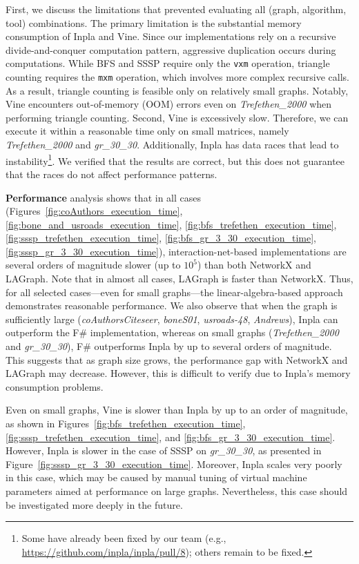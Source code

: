 First, we discuss the limitations that prevented evaluating all (graph, algorithm, tool) combinations. 
The primary limitation is the substantial memory consumption of Inpla and Vine.
Since our implementations rely on a recursive divide-and-conquer computation pattern, aggressive duplication occurs during computations. 
While BFS and SSSP require only the \verb|vxm| operation, triangle counting requires the \verb|mxm| operation, which involves more complex recursive calls.
As a result, triangle counting is feasible only on relatively small graphs.
Notably, Vine encounters out-of-memory (OOM) errors even on \emph{Trefethen\_2000} when performing triangle counting.
Second, Vine is excessively slow.
Therefore, we can execute it within a reasonable time only on small matrices, namely \emph{Trefethen\_2000} and \emph{gr\_30\_30}.
Additionally, Inpla has data races that lead to instability\footnote{Some have already been fixed by our team (e.g., \url{https://github.com/inpla/inpla/pull/8}); others remain to be fixed.}.
We verified that the results are correct, but this does not guarantee that the races do not affect performance patterns.

\textbf{Performance} analysis shows that in all cases (Figures~\ref{fig:coAuthors_execution_time}, \ref{fig:bone_and_usroads_execution_time}, \ref{fig:bfs_trefethen_execution_time}, \ref{fig:sssp_trefethen_execution_time}, \ref{fig:bfs_gr_3_30_execution_time}, \ref{fig:sssp_gr_3_30_execution_time}), interaction-net-based implementations are several orders of magnitude slower (up to $10^5$) than both NetworkX and LAGraph. 
Note that in almost all cases, LAGraph is faster than NetworkX.
Thus, for all selected cases---even for small graphs---the linear-algebra-based approach demonstrates reasonable performance.
We also observe that when the graph is sufficiently large (\emph{coAuthorsCiteseer}, \emph{boneS01}, \emph{usroads-48}, \emph{Andrews}), Inpla can outperform the F\# implementation, whereas on small graphs (\emph{Trefethen\_2000} and \emph{gr\_30\_30}), F\# outperforms Inpla by up to several orders of magnitude.
This suggests that as graph size grows, the performance gap with NetworkX and LAGraph may decrease.
However, this is difficult to verify due to Inpla's memory consumption problems.  

Even on small graphs, Vine is slower than Inpla by up to an order of magnitude, as shown in Figures~\ref{fig:bfs_trefethen_execution_time}, \ref{fig:sssp_trefethen_execution_time}, and \ref{fig:bfs_gr_3_30_execution_time}.
However, Inpla is slower in the case of SSSP on \emph{gr\_30\_30}, as presented in Figure~\ref{fig:sssp_gr_3_30_execution_time}.
Moreover, Inpla scales very poorly in this case, which may be caused by manual tuning of virtual machine parameters aimed at performance on large graphs.
Nevertheless, this case should be investigated more deeply in the future.

